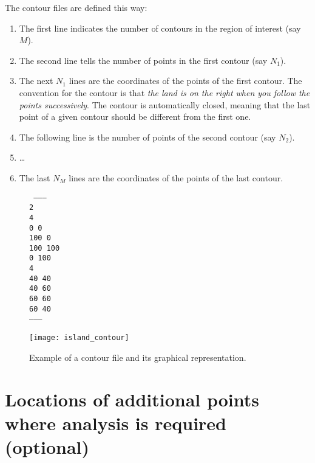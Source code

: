 The contour files are defined this way:
\begin{enumerate}
\item The first line indicates the number of contours in the region of interest (say $M$).
\item The second line tells the number of points in the first contour (say $N_{1}$).
\item The next $N_1$ lines are the coordinates of the points of the first contour. The convention for the contour is that \textsl{the land is on the right when you follow the points successively}. The contour is automatically closed, meaning that the last point of a given contour should be different from the first one. 
\item The following line is the number of points of the second contour (say $N_{2}$).
\item \ldots
\item The last $N_M$ lines are the coordinates of the points of the last contour.
\end{enumerate}


\begin{figure}[H]
\centering 
\parbox{.5\textwidth}{

\begin{footnotesize}
\tt
--------\\
2\\
4\\
0 0\\
100 0\\
100 100\\
0 100\\
4\\
40 40\\
40 60\\
60 60\\
60 40\\
--------
\end{footnotesize}

}\parbox{.5\textwidth}{
\texttt{[image: island\_contour]}
}

\caption{Example of a contour file and its graphical representation.}
\end{figure}



\section[Additional points of analysis]{Locations of additional points where analysis is required (optional)}

